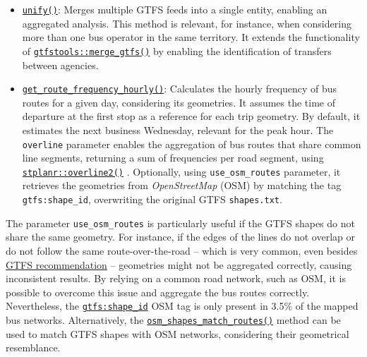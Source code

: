 \documentclass[
]{article}
\begin{document}
\begin{itemize}
\item
  \href{https://u-shift.github.io/GTFShift/reference/unify.html}{\texttt{unify()}}: Merges multiple GTFS feeds into a single entity, enabling an aggregated analysis.
  This method is relevant, for instance, when considering more than one bus operator in the same territory.
  It extends the functionality of \href{https://ipeagit.github.io/gtfstools/reference/merge_gtfs.html}{\texttt{gtfstools::merge\_gtfs()}} by enabling the identification of transfers between agencies.
\item
  \href{https://u-shift.github.io/GTFShift/reference/get_route_frequency_hourly.html}{\texttt{get\_route\_frequency\_hourly()}}: Calculates the hourly frequency of bus routes for a given day, considering its geometries.
  It assumes the time of departure at the first stop as a reference for each trip geometry.
  By default, it estimates the next business Wednesday, relevant for the peak hour.
  The \texttt{overline} parameter enables the aggregation of bus routes that share common line segments, returning a sum of frequencies per road segment, using \href{https://docs.ropensci.org/stplanr/reference/overline.html}{\texttt{stplanr::overline2()}} \citep{stplanr}.
  Optionally, using \texttt{use\_osm\_routes} parameter, it retrieves the geometries from \emph{OpenStreetMap} (OSM) by matching the tag \texttt{gtfs:shape\_id}, overwriting the original GTFS \texttt{shapes.txt}.
\end{itemize}

The parameter \texttt{use\_osm\_routes} is particularly useful if the GTFS shapes do not share the same geometry.
For instance, if the edges of the lines do not overlap or do not follow the same route-over-the-road -- which is very common, even besides \href{https://gtfs.org/documentation/schedule/schedule-best-practices/\#shapestxt}{GTFS recommendation} -- geometries might not be aggregated correctly, causing inconsistent results.
By relying on a common road network, such as OSM, it is possible to overcome this issue and aggregate the bus routes correctly.
Nevertheless, the \href{https://wiki.openstreetmap.org/wiki/Key:gtfs:shape_id}{\texttt{gtfs:shape\_id}} OSM tag is only present in 3.5\% of the mapped bus networks.
Alternatively, the \href{https://u-shift.github.io/GTFShift/reference/osm_shapes_match_routes.html}{\texttt{osm\_shapes\_match\_routes()}} method can be used to match GTFS shapes with OSM networks, considering their geometrical resemblance.
\end{document}
